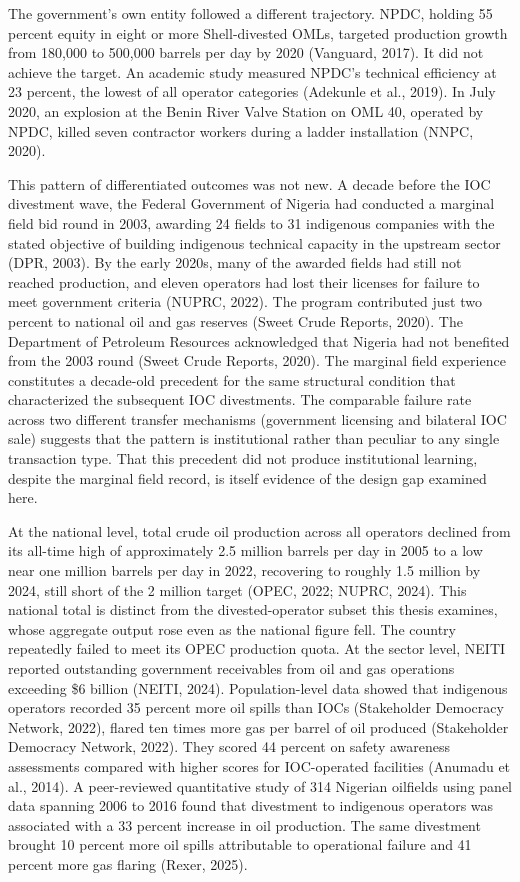 \documentclass[twoside,fontset=lmodern]{mitthesis}
\begin{document}
The government's own entity followed a different trajectory. NPDC,
holding 55 percent equity in eight or more Shell-divested OMLs, targeted
production growth from 180,000 to 500,000 barrels per day by 2020
(Vanguard, 2017). It did not achieve the target. An academic study
measured NPDC's technical efficiency at 23 percent, the lowest of all
operator categories (Adekunle et al., 2019). In July 2020, an explosion
at the Benin River Valve Station on OML 40, operated by NPDC, killed
seven contractor workers during a ladder installation (NNPC, 2020).

This pattern of differentiated outcomes was not new. A decade before the
IOC divestment wave, the Federal Government of Nigeria had conducted a
marginal field bid round in 2003, awarding 24 fields to 31 indigenous
companies with the stated objective of building indigenous technical
capacity in the upstream sector (DPR, 2003). By the early 2020s, many of
the awarded fields had still not reached production, and eleven
operators had lost their licenses for failure to meet government
criteria (NUPRC, 2022). The program contributed just two percent to
national oil and gas reserves (Sweet Crude Reports, 2020). The
Department of Petroleum Resources acknowledged that Nigeria had not
benefited from the 2003 round (Sweet Crude Reports, 2020). The marginal
field experience constitutes a decade-old precedent for the same
structural condition that characterized the subsequent IOC divestments.
The comparable failure rate across two different transfer mechanisms
(government licensing and bilateral IOC sale) suggests that the pattern
is institutional rather than peculiar to any single transaction type.
That this precedent did not produce institutional learning, despite the
marginal field record, is itself evidence of the design gap examined
here.

At the national level, total crude oil production across all operators
declined from its all-time high of approximately 2.5 million barrels per
day in 2005 to a low near one million barrels per day in 2022,
recovering to roughly 1.5 million by 2024, still short of the 2 million
target (OPEC, 2022; NUPRC, 2024). This national total is distinct from
the divested-operator subset this thesis examines, whose aggregate
output rose even as the national figure fell. The country repeatedly
failed to meet its OPEC production quota. At the sector level, NEITI
reported outstanding government receivables from oil and gas operations
exceeding \$6 billion (NEITI, 2024). Population-level data showed that
indigenous operators recorded 35 percent more oil spills than IOCs
(Stakeholder Democracy Network, 2022), flared ten times more gas per
barrel of oil produced (Stakeholder Democracy Network, 2022). They
scored 44 percent on safety awareness assessments compared with higher
scores for IOC-operated facilities (Anumadu et al., 2014). A
peer-reviewed quantitative study of 314 Nigerian oilfields using panel
data spanning 2006 to 2016 found that divestment to indigenous operators
was associated with a 33 percent increase in oil production. The same
divestment brought 10 percent more oil spills attributable to
operational failure and 41 percent more gas flaring (Rexer, 2025).
\end{document}
